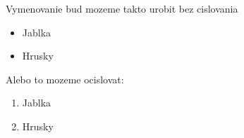 \documentclass{book}
\begin{document}
Vymenovanie bud  mozeme takto urobit  bez cislovania
\begin{itemize}
\item Jablka
\item Hrusky
\end{itemize}

Alebo to mozeme ocislovat:
\begin{enumerate}
\item Jablka
\item Hrusky
\end{enumerate}
\end{document}
